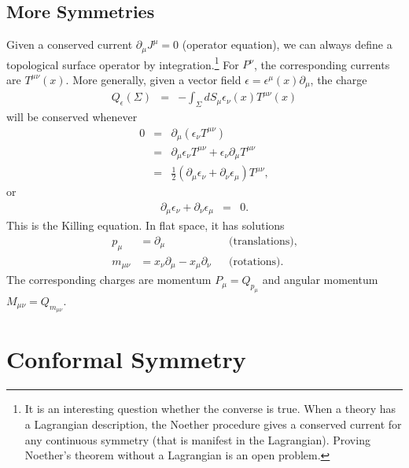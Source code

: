 \documentclass{ws-rv9x6}
\newcommand\be{\begin{eqnarray}}
\newcommand\ee{\end{eqnarray}}
\newcommand\ptl\partial
\newcommand\e\epsilon
\newcommand\<\langle
\renewcommand\>\rangle
\newcommand\nn{\nonumber}
\renewcommand\.{\cdot}
\begin{document}
\subsection{More Symmetries}

Given a conserved current $\ptl_\mu J^\mu=0$ (operator equation), we can always define a topological surface operator by integration.\footnote{It is an interesting question whether the converse is true. When a theory has a Lagrangian description, the Noether procedure gives a conserved current for any continuous symmetry (that is manifest in the Lagrangian).  Proving Noether's theorem without a Lagrangian is an open problem.} For $P^\nu$, the corresponding currents are $T^{\mu\nu}(x)$.  More generally, given a vector field $\e=\e^\mu(x)\ptl_\mu$, the charge
\be
Q_\e(\Sigma) &=& -\int_\Sigma dS_\mu \e_\nu(x) T^{\mu\nu}(x)
\ee
will be conserved whenever
\be
0&=&\ptl_\mu(\e_\nu T^{\mu\nu}) \nn\\
&=&
 \ptl_\mu \e_\nu T^{\mu\nu}+\e_\nu \ptl_\mu T^{\mu\nu}\nn\\
&=& \frac 1 2(\ptl_\mu \e_\nu+\ptl_\nu \e_\mu) T^{\mu\nu},
\ee
or
\be
\label{eq:killingvector}
\ptl_\mu\e_\nu+\ptl_\nu\e_\mu &=& 0.
\ee
This is the Killing equation. In flat space, it has solutions
\begin{align}
\label{eq:poincaregenerators}
p_\mu &= \ptl_\mu &&\textrm{(translations)},\nn\\
m_{\mu\nu} &= x_\nu\ptl_\mu - x_\mu\ptl_\nu && \textrm{(rotations)}.
\end{align}
The corresponding charges
are momentum $P_\mu=Q_{p_\mu}$ and angular momentum $M_{\mu\nu}=Q_{m_{\mu\nu}}$.

\section{Conformal Symmetry}
\end{document}
